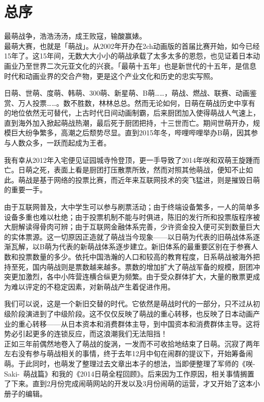 \chapter*{总序}

最萌战争，浩浩汤汤，成王败寇，输酸赢婊。
\\

最萌大赛，也就是「萌战」。从2002年开办在2ch动画版的首届比赛开始，如今已经15年了。这15年间，无数大大小小的萌战承载了太多太多的恩怨，也见证着日本动画业乃至世界二次元亚文化的兴衰。「最萌十五年」也是新世代的十五年，是信息时代和动画业界的交合产物，更是这个产业文化和历史的忠实写照。

日萌、世萌、度萌、韩萌、300萌、新星萌、B萌……，萌战、燃战、联赛、动画鉴赏、万人投票……。数不胜数，林林总总。然而无论如何，日萌在萌战历史中享有的地位依然无可替代，上古时代日间动画制霸，后来厨团加入使得萌战人气速上，直到海外加入掀起萌战热潮，最后死于厨团把持，十三世而亡。期间世萌开办，规模巨大纷争繁多，高潮之后颓势尽显。直到2015年冬，哔哩哔哩举办B萌，因其参与人数众多，一跃而起成为王者。

我有幸从2012年入宅便见证园城寺怜登顶，更一手导致了2014年咲和双萌王旋踵而亡。日萌之死，表面上看是厨团打压散票所致，然而对照其他萌战，便知不止如此。萌战是基于网络的投票比赛，而近年来互联网技术的突飞猛进，则是摧毁日萌的重要一手。

由于互联网普及，大中学生可以参与刷票活动；由于终端设备繁多，一人的简单多设备多重也难以杜绝；由于投票机制不能与时俱进，陈旧的发行所和投票版程序被大厨解读得骨肉可辨；由于互联网金融体系完善，少许资金投入便可买到数量巨大的实体票源。这一切原因正造就了萌战当今现象——以日萌为代表的旧萌战体系逐渐瓦解，以B萌为代表的新萌战体系逐步建立。新旧体系的最重要区别在于参赛人数和投票数量的多少。依托中国浩瀚的人口和较高的教育程度，日系萌战被海外把持至死，国内萌战则是票数越来越多。票数的增加扩大了萌战军备的规模，厨团冲突更加激烈，各中小阵营连横合纵更为频繁。由于受众群体扩大，大量的散票更成为难以评定的不稳定因素，对新萌战产生着促进作用。

我们可以说，这是一个新旧交替的时代。它依然是萌战时代的一部分，只不过从初级阶段演进到了中级阶段。这不仅仅反映了萌战的重心转移，也反映了日本动画产业的重心转移——从日本资本和消费群体主导，到中国资本和消费群体主导。这将势必引起更多的连锁反应，而这浪潮我们无法阻挡！
\\

正如三年前偶然地卷入了萌战的旋涡，一发而不可收拾地结束了日萌。沉寂了两年左右没有参与萌战相关的事情，终于去年12月中旬在闹群的提议下，开始筹备闹萌。于此同时，也萌发了整理过去文章出本子的想法，当即便整理了军师的《咲-Saki-~萌战篇》和我的《2014日萌全程回顾》。后来因为工作原因，相关事情搁置了下来。直到2月份完成闹萌网站的开发以及3月份闹萌的运营，才又开始了这本小册子的编辑。

